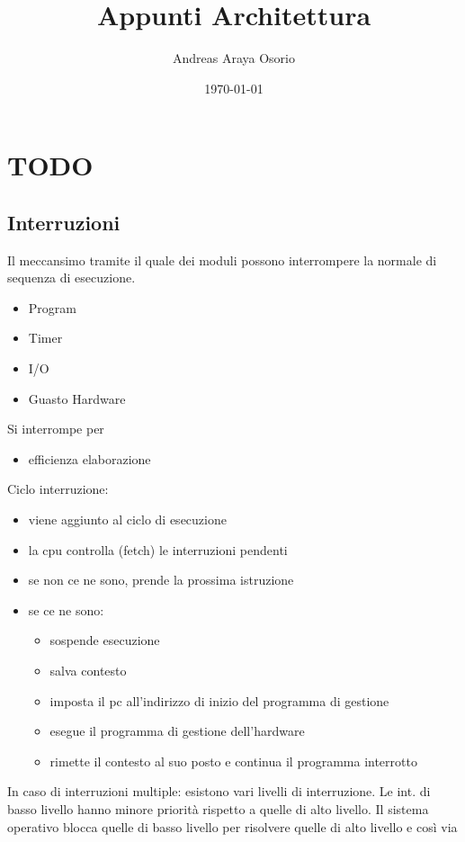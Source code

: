 \documentclass[12pt, a4paper]{article}
\title{Appunti Architettura}
\author{Andreas Araya Osorio}
\date{\today}
\theoremstyle{break}
\theoremstyle{lemma}
\theoremstyle{lemma}
\theoremstyle{lemma}
\begin{document}
\maketitle


\section{ TODO }
\subsection{Interruzioni}
Il meccansimo tramite il quale dei moduli possono interrompere la normale di sequenza di esecuzione. \newline

\begin{itemize}
	\item Program
	\item Timer
	\item I/O
	\item Guasto Hardware
	\end{itemize}
Si interrompe per
\begin{itemize}
	\item efficienza elaborazione
\end{itemize}

Ciclo interruzione:
\begin{itemize}
	\item viene aggiunto al ciclo di esecuzione
	\item la cpu controlla (fetch) le interruzioni pendenti
	\item se non ce ne sono, prende la prossima istruzione
	\item se ce ne sono: 
	\begin{itemize}
		\item sospende esecuzione
		\item salva contesto
		\item imposta il pc all'indirizzo di inizio del programma di gestione
		\item esegue il programma di gestione dell'hardware
		\item rimette il contesto al suo posto e continua il programma interrotto
	\end{itemize}
\end{itemize}
In caso di interruzioni multiple: esistono vari livelli di interruzione. Le int. di basso livello hanno minore priorità rispetto a quelle di alto livello. 
Il sistema operativo blocca quelle di basso livello per risolvere quelle di alto livello e così via
\end{document}
